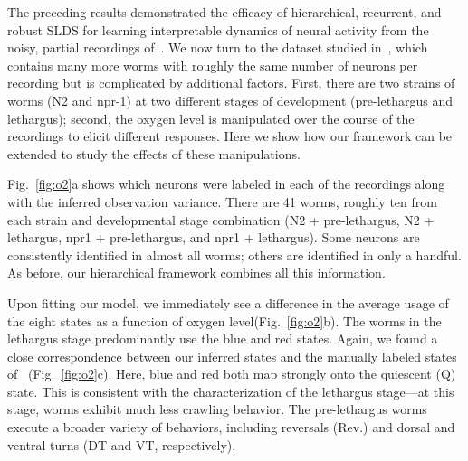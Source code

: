 \documentclass[11pt]{article}
\begin{document}
The preceding results demonstrated the efficacy of hierarchical,
recurrent, and robust SLDS for learning interpretable dynamics of
neural activity from the noisy, partial recordings
of~\citet{kato2015global}.  We now turn to the dataset studied
in~\citet{nichols2017global}, which contains many more worms with
roughly the same number of neurons per recording but is complicated by
additional factors.  First, there are two strains of worms (N2 and
npr-1) at two different stages of development (pre-lethargus and
lethargus); second, the oxygen level is manipulated over the course of
the recordings to elicit different responses.  Here we show how our
framework can be extended to study the effects of these manipulations.

Fig.~\ref{fig:o2}a shows which neurons were labeled in each of the
recordings along with the inferred observation variance. There are 41
worms, roughly ten from each strain and developmental stage
combination (N2 + pre-lethargus, N2 + lethargus, npr1 + pre-lethargus,
and npr1 + lethargus). Some neurons are consistently identified in
almost all worms; others are identified in only a handful.  As before,
our hierarchical framework combines all this information.

Upon fitting our model, we immediately see a difference in the average
usage of the eight states  as a function of oxygen level(Fig.~\ref{fig:o2}b). The worms in the
lethargus stage predominantly use the blue and red states.  Again,
we found a close correspondence between our inferred states and the
manually labeled states of~\citet{nichols2017global}
(Fig.~\ref{fig:o2}c). Here, blue and red both map strongly onto the
quiescent (\textsf{Q}) state. This is consistent with the
characterization of the lethargus stage---at this stage, worms exhibit
much less crawling behavior. The pre-lethargus worms execute a broader
variety of behaviors, including reversals (\textsf{Rev.}) and dorsal
and ventral turns  (\textsf{DT} and \textsf{VT}, respectively). 
\end{document}
